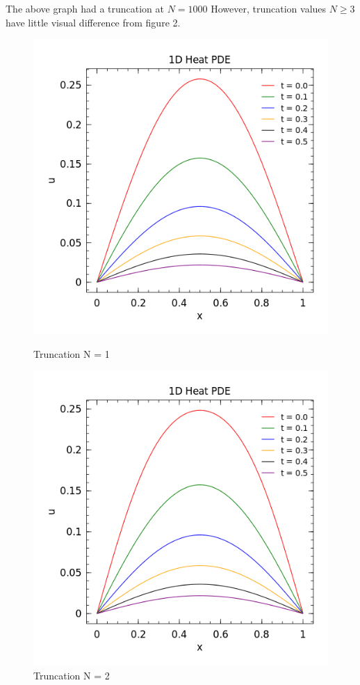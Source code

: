 \documentclass[10pt]{article}
\begin{document}
\noindent The above graph had a truncation at $N = 1000$ However, truncation values $N \geq 3$ have little visual difference from figure 2.

\begin{figure}[h]
\centering
\begin{minipage}{.5\textwidth}
  \centering
  \includegraphics[width=.8\linewidth]{HW2_3b1.png}
  \caption*{Truncation N = 1}
  \label{fig:test1}
\end{minipage}%
\begin{minipage}{.5\textwidth}
  \centering
  \includegraphics[width=.8\linewidth]{HW2_3b2.png}
  \caption*{Truncation N = 2}
  \label{fig:test2}
\end{minipage}
\end{figure}
\end{document}
